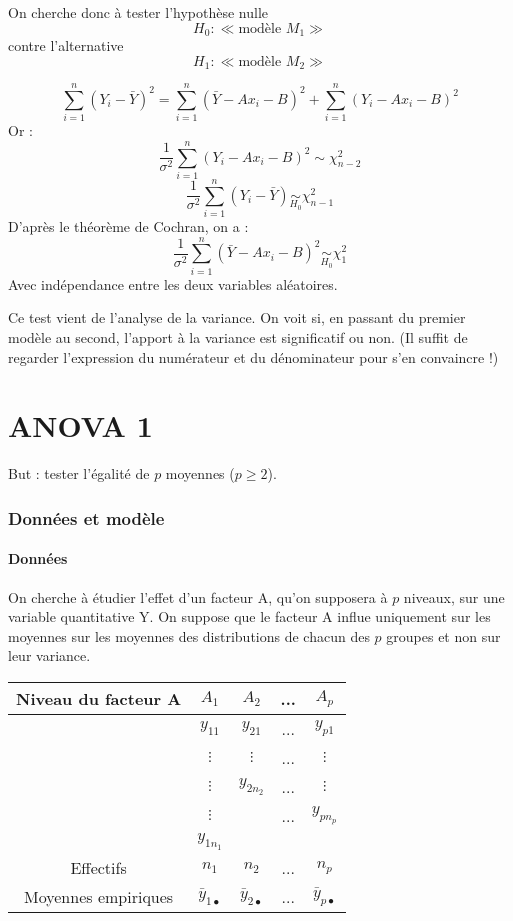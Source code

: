 On cherche donc à tester l'hypothèse nulle \[H_0:\ll\text{modèle } M_1\gg\] contre l'alternative \[H_1:\ll\text{modèle } M_2\gg\]


\begin{dem}
	\[\sum_{i=1}^n (Y_i-\bar{Y})^2=\sum_{i=1}^n (\bar{Y}-Ax_i-B)^2+\sum_{i=1}^n (Y_i-Ax_i-B)^2\]
Or :
	\[\frac{1}{\sigma^2} \sum_{i=1}^n(Y_i-Ax_i-B)^2\sim \chi^2_{n-2}\]
	\[\frac{1}{\sigma^2} \sum_{i=1}^n (Y_i-\bar{Y}) \underset{H_0}{\sim} \chi_{n-1}^2\]
D'après le théorème de Cochran, on a :
	\[\frac{1}{\sigma^2} \sum_{i=1}^n (\bar{Y}-Ax_i-B)^2\underset{H_0}{\sim}\chi^2_1\]
Avec indépendance entre les deux variables aléatoires.
\end{dem}


Ce test vient de l'analyse de la variance. On voit si, en passant du premier modèle au second, l'apport à la variance est significatif ou non. (Il suffit de regarder l'expression du numérateur et du dénominateur pour s'en convaincre !)

\part{ANOVA 1}
But : tester l'égalité de $p$ moyennes ($p\geq 2$).
\section{Données et modèle}
\subsection{Données}
On cherche à étudier l'effet d'un facteur A, qu'on supposera à $p$ niveaux, sur une variable quantitative Y. On suppose que le facteur A influe uniquement sur les moyennes sur les moyennes des distributions de chacun des $p$ groupes et non sur leur variance.
\begin{center}\begin{tabular}{|c||c|c|c|c|}
\hline
Niveau du facteur A & $A_1$ & $A_2$ & ... & $A_p$ \\
\hline
		    & $y_{11}$ & $y_{21}$ & ... & $y_{p1}$ \\
		    & $\vdots$ & $\vdots$ & ... & $\vdots$ \\
		    & $\vdots$ & $y_{2n_2}$&...& $\vdots$ \\
		    & $\vdots$ &          & ... & $y_{pn_p}$ \\
		    & $y_{1n_1}$ &         &    &          \\
\hline
Effectifs           &   $n_1$  &  $n_2$   & ... & $n_p$ \\
\hline
Moyennes empiriques & $\bar{y}_{1\bullet}$ & $\bar{y}_{2\bullet}$ & ... & $\bar{y}_{p\bullet}$\\
\hline
\end{tabular}\end{center}

